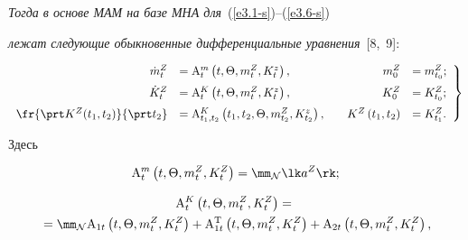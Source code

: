 \textit{Тогда в основе МАМ на базе МНА для}~(\ref{e3.1-s})--(\ref{e3.6-s}) 

\textit{лежат следующие обыкновенные дифференциальные уравнения}~[8,~9]:

    \begin{equation}

    \left.

    \begin{array}{rlrl}

    \dot m_t^Z &= \mathrm{A}_t^m \left(t,\Theta,m_t^Z, K_t^z\right), &\quad m_0^Z &= 

m_{t_0}^Z;

\\[6pt]

    \dot K_t^Z &= \mathrm{A}_t^K \left(t,\Theta,m_t^Z, K_t^z\right), &\quad K_0^Z &=  K_{t_0}^Z;

\\[6pt]

    \fr{\prt K^Z (t_1, t_2)}{\prt t_2} &=\mathrm {A}_{t_1, t_2}^K \left(t_1,  t_2,\Theta,m_{t_2}^Z, K_{t_2}^z\right),&\quad

    K^Z\left(t_1, t_2\right) &= K_{t_1}^Z.

    \end{array}

    \right\}

    \label{e3.7-s}

    \end{equation}

    Здесь



    \begin{equation}

    \mathrm{A}_t^m \left(t,\Theta,m_t^Z, K_t^Z\right)= \mm_{\mathcal{N}}\lk a^Z\rk;

    \label{e49a}

   \end{equation}

   

   \vspace*{-12pt}

   

   \noindent

   \begin{multline}

        \mathrm{A}_t^K \left(t, \Theta,m_t^Z, K_t^Z\right)={}\\

        {}=\mm_{\mathcal{N}}{\mathrm{A}}_{1t} 

\left(t,\Theta,m_t^Z, K_t^Z\right)+\mathrm{A}_{1t}^{\mathrm{T}} \left(t,\Theta,m_t^Z, K_t^Z\right)+{\mathrm{A}}_{2t}\left(t,\Theta,m_t^Z, K_t^Z\right),

\label{e49b}

\end{multline}




